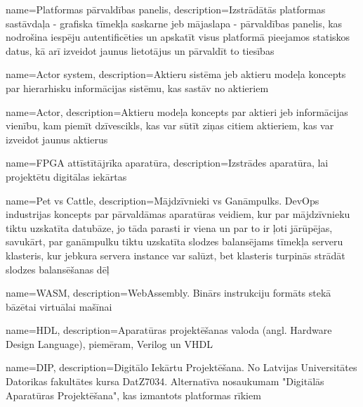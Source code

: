 {
    name=Platformas pārvaldības panelis,
    description={Izstrādātās platformas sastāvdaļa - grafiska tīmekļa saskarne jeb mājaslapa - pārvaldības panelis, 
        kas nodrošina iespēju autentificēties un apskatīt visus platformā pieejamos statiskos datus, kā arī izveidot
        jaunus lietotājus un pārvaldīt to tiesības}
}

{
    name=Actor system,
    description={Aktieru sistēma jeb aktieru modeļa koncepts par hierarhisku informācijas sistēmu, kas sastāv no aktieriem}
}

{
    name=Actor,
    description={Aktieru modeļa koncepts par aktieri jeb informācijas vienību, kam piemīt dzīvescikls, 
        kas var sūtīt ziņas citiem aktieriem, kas var izveidot jaunus aktierus}
}

{
    name=FPGA attīstītājrīka aparatūra,
    description={Izstrādes aparatūra, lai projektētu digitālas iekārtas}
}

{
    name=Pet vs Cattle,
    description={Mājdzīvnieki vs Ganāmpulks. DevOps industrijas koncepts par pārvaldāmas aparatūras veidiem, kur
        par mājdzīvnieku tiktu uzskatīta datubāze, jo tāda parasti ir viena un par to ir ļoti jārūpējas, savukārt,
        par ganāmpulku tiktu uzskatīta slodzes balansējams tīmekļa serveru klasteris, kur jebkura servera instance
        var salūzt, bet klasteris turpinās strādāt slodzes balansēšanas dēļ}
}

{
    name=WASM,
    description={WebAssembly. Binārs instrukciju formāts stekā bāzētai virtuālai mašīnai}
}

{
    name=HDL,
    description={Aparatūras projektēšanas valoda (angl. Hardware Design Language), piemēram, Verilog un VHDL}
}

{
    name=DIP,
    description={Digitālo Iekārtu Projektēšana. No Latvijas Universitātes Datorikas fakultātes kursa DatZ7034. 
        Alternatīva nosaukumam "Digitālās Aparatūras Projektēšana", kas izmantots platformas rīkiem}
}